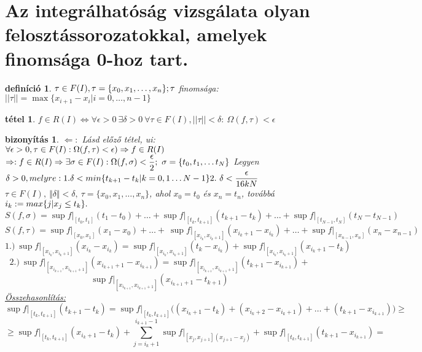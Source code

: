 \documentclass{article}
\newcommand{\ek}{\Longleftrightarrow}
\newcommand{\nn}{\Rightarrow}
\newcommand{\nb}{\Leftarrow}
\newcommand{\di}{\displaystyle}
\theoremstyle{magyar}
\newtheorem{de}{definíció}[section]
\newtheorem{te}{tétel}[section]
\newtheorem{bi}{bizonyítás}[section]
\begin{document}
  \section{Az integrálhatóság vizsgálata olyan felosztássorozatokkal, amelyek finomsága 0-hoz tart.}
  \begin{de}
    $\tau\in{F(I)}, \tau=\{x_0,x_1,\ldots,x_n\};\\\tau$ finomsága: $||\tau||=\max{\{x_{i+1}-x_i|i=0,\ldots,n-1\}}$
  \end{de}
  \begin{te}
    $f\in{R(I)}\ek\forall\epsilon>0\ \exists\delta>0\ \forall\tau\in{F(I)},||\tau||<\delta:\ \Omega(f,\tau)<\epsilon$
  \end{te}
  \begin{bi}
    $\di\nb:$ Lásd előző tétel, ui:  $\forall\epsilon>0,\tau\in{F(I)}:\Omega(f,\tau)<\epsilon)\nn
    f\in R(I)\\$
    $\nn: f\in R(I)\nn \exists\sigma\in F(I):\Omega(f,\sigma)<\dfrac{\epsilon}{2};
    \ \sigma=\lbrace t_0,t_1,\ldots t_N\rbrace \\$
    Legyen $\delta>0, melyre:\\1.\delta<min\lbrace t_{k+1}-t_k\vert k=0,1\ldots N-1\rbrace\\
    2.\ \delta<\dfrac{\epsilon}{16kN}\\$
    $\tau\in F(I),\ \Vert\delta\Vert<\delta,\ \tau=\lbrace x_0,x_1,\ldots,x_n\rbrace$, ahol $x_0=t_0$ és $x_n=t_n$, továbbá\\
    $i_k:=max\lbrace j\vert x_j\le t_k\rbrace.\\$
    \[S(f,\sigma)=\sup f\vert_{[t_0,t_1]}(t_1-t_0)+\ldots+\sup f\vert_{[t_k,t_{k+1}]}(t_{k+1}-t_k)+\ldots+\sup f\vert_{[t_{N-1},t_N]}(t_N-t_{N-1})\]
    \[S(f,\tau)=\sup f\vert_{[x_0,x_1]}(x_1-x_0)+\ldots+\ \sup f\vert_{[x_{i_k},x_{i_k+1}]}(x_{i_k+1}-x_{i_k})+\ldots+\sup f\vert_{[x_{n-1},x_n]}(x_n-x_{n-1})\]
    \[1.)\ \sup f\vert_{[x_{i_k},x_{i_k+1}]}(x_{i_k}-x_{i_k})=\sup f\vert_{[x_{i_k},x_{i_k+1}]}(t_{k}-x_{i_k})+\sup f\vert_{[x_{i_k},x_{i_k+1}]}(x_{i_k+1}-t_{k})\]
    \[2.)\ \sup f\vert_{[x_{i_{k+1}},x_{i_{k+1}+1}]}(x_{i_{k+1}+1}-x_{i_{k+1}})=\sup f\vert_{[x_{i_{k+1}},x_{i_{k+1}+1}]}(t_{k+1}-x_{i_{k+1}})+\]\[\sup f\vert_{[x_{i_{k+1}},x_{i_{k+1}+1}]}(x_{i_{k+1}+1}-t_{k+1})\]
    \underline{Összehasonlítás:}
    \[\sup f\vert_{[t_k,t_{k+1}]}(t_{k+1}-t_k)=\sup f\vert_{[t_k,t_{k+1}]}\big((x_{i_k+1}-t_k)+(x_{i_k+2}-x_{i_k+1})+\ldots+(t_{k+1}-x_{i_{k+1}})\big)\ge\]
    \[\ge \sup f\vert_{[t_k,t_{k+1}]}(x_{i_k+1}-t_k)+\sum_{j=i_k+1}^{i_{k+1}-1}{\sup f\vert_{[x_j,x_{j+1}](x_{j+1}-x_j)}}+\sup f\vert_{[t_k,t_{k+1}]}(t_{k+1}-x_{i_{k+1}})=\]

\end{bi}
\end{document}
